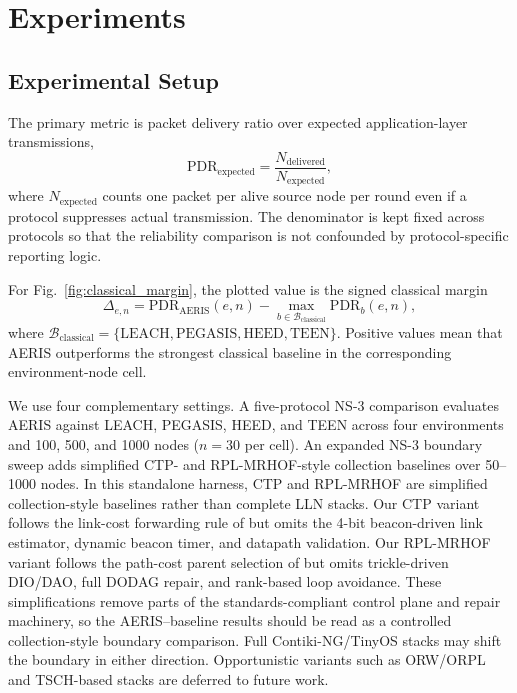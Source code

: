 \documentclass[conference]{IEEEtran}
\begin{document}
\section{Experiments}
\subsection{Experimental Setup}
The primary metric is packet delivery ratio over expected application-layer transmissions,
\begin{equation}
\mathrm{PDR}_{\mathrm{expected}}=\frac{N_{\mathrm{delivered}}}{N_{\mathrm{expected}}},
\end{equation}
where $N_{\mathrm{expected}}$ counts one packet per alive source node per round even if a protocol suppresses actual transmission. The denominator is kept fixed across protocols so that the reliability comparison is not confounded by protocol-specific reporting logic.

For Fig.~\ref{fig:classical_margin}, the plotted value is the signed classical margin
\begin{equation}
\Delta_{e,n}=\mathrm{PDR}_{\mathrm{AERIS}}(e,n)-\max_{b\in\mathcal{B}_{\mathrm{classical}}}\mathrm{PDR}_b(e,n),
\end{equation}
where $\mathcal{B}_{\mathrm{classical}}=\{\mathrm{LEACH},\mathrm{PEGASIS},\mathrm{HEED},\mathrm{TEEN}\}$. Positive values mean that AERIS outperforms the strongest classical baseline in the corresponding environment-node cell.

We use four complementary settings. A five-protocol NS-3 comparison evaluates AERIS against LEACH, PEGASIS, HEED, and TEEN across four environments and 100, 500, and 1000 nodes ($n=30$ per cell). An expanded NS-3 boundary sweep adds simplified CTP- and RPL-MRHOF-style collection baselines over 50--1000 nodes. In this standalone harness, CTP and RPL-MRHOF are simplified collection-style baselines rather than complete LLN stacks. Our CTP variant follows the link-cost forwarding rule of \cite{gnawali2009collection} but omits the 4-bit beacon-driven link estimator, dynamic beacon timer, and datapath validation. Our RPL-MRHOF variant follows the path-cost parent selection of \cite{tsvetkov2011rpl,gnawali2012minimum} but omits trickle-driven DIO/DAO, full DODAG repair, and rank-based loop avoidance. These simplifications remove parts of the standards-compliant control plane and repair machinery, so the AERIS--baseline results should be read as a controlled collection-style boundary comparison. Full Contiki-NG/TinyOS stacks may shift the boundary in either direction. Opportunistic variants such as ORW/ORPL \cite{landsiedel2012low,duquennoy2013let} and TSCH-based stacks \cite{duquennoy2015orchestra} are deferred to future work.
\end{document}
